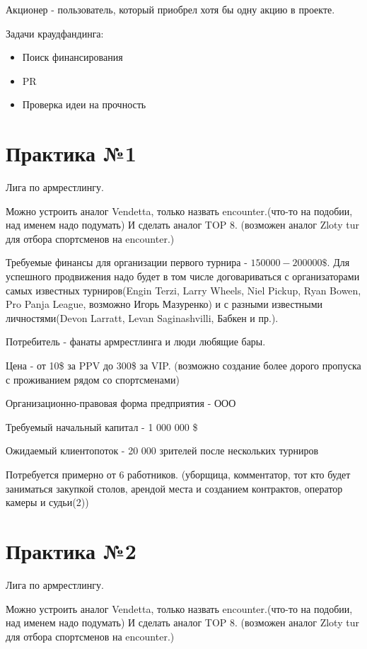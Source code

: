 \documentclass[a4paper, 12pt]{article}
\begin{document}
	Акционер - пользователь, который приобрел хотя бы одну акцию в проекте.
	
	Задачи краудфандинга:
	\begin{itemize}
		\item Поиск финансирования
		\item PR
		\item Проверка идеи на прочность
	\end{itemize}
	
	\part*{Практика №1}
	
	Лига по армрестлингу. 
	
	Можно устроить аналог Vendetta, только назвать encounter.(что-то на подобии, над именем надо подумать) И сделать аналог TOP 8. (возможен аналог Zloty tur для отбора спортсменов на encounter.)
	
	Требуемые финансы для организации первого турнира - $150 000 - 200 000 \$$. Для успешного продвижения надо будет в том числе договариваться с организаторами самых известных турниров(Engin Terzi, Larry Wheels, Niel Pickup, Ryan Bowen, Pro Panja League, возможно Игорь Мазуренко) и с разными известными личностями(Devon Larratt, Levan Saginashvilli, Бабкен и пр.). 
	
	Потребитель - фанаты армрестлинга и люди любящие бары.
	
	Цена - от 10\$ за PPV до 300\$ за VIP. (возможно создание более дорого пропуска с проживанием рядом со спортсменами)
	
	Организационно-правовая форма предприятия - ООО
	
	Требуемый начальный капитал - 1 000 000 \$
	
	Ожидаемый клиентопоток - 20 000 зрителей после нескольких турниров
	
	Потребуется примерно от 6 работников. (уборщица, комментатор, тот кто будет заниматься закупкой столов, арендой места и созданием контрактов, оператор камеры и судьи(2))
	
	\part*{Практика №2}
	
	Лига по армрестлингу. 
	
	Можно устроить аналог Vendetta, только назвать encounter.(что-то на подобии, над именем надо подумать) И сделать аналог TOP 8. (возможен аналог Zloty tur для отбора спортсменов на encounter.)
	
\end{document}
